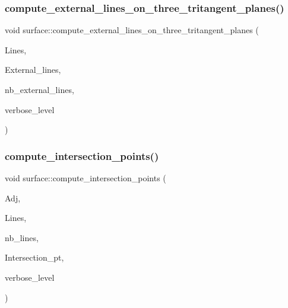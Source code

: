 \mbox{\label{classsurface_ac7678771ed61c488809ea26825484bed}} 
\subsubsection{\texorpdfstring{compute\+\_\+external\+\_\+lines\+\_\+on\+\_\+three\+\_\+tritangent\+\_\+planes()}{compute\_external\_lines\_on\_three\_tritangent\_planes()}}
{\footnotesize\ttfamily void surface\+::compute\+\_\+external\+\_\+lines\+\_\+on\+\_\+three\+\_\+tritangent\+\_\+planes (\begin{DoxyParamCaption}\item[{\mbox{\hyperlink{galois_8h_a09fddde158a3a20bd2dcadb609de11dc}{I\+NT}} $\ast$}]{Lines,  }\item[{\mbox{\hyperlink{galois_8h_a09fddde158a3a20bd2dcadb609de11dc}{I\+NT}} $\ast$\&}]{External\+\_\+lines,  }\item[{\mbox{\hyperlink{galois_8h_a09fddde158a3a20bd2dcadb609de11dc}{I\+NT}} \&}]{nb\+\_\+external\+\_\+lines,  }\item[{\mbox{\hyperlink{galois_8h_a09fddde158a3a20bd2dcadb609de11dc}{I\+NT}}}]{verbose\+\_\+level }\end{DoxyParamCaption})}

\mbox{\label{classsurface_a496b99c021b2546b0e610105d56bb549}} 
\subsubsection{\texorpdfstring{compute\+\_\+intersection\+\_\+points()}{compute\_intersection\_points()}}
{\footnotesize\ttfamily void surface\+::compute\+\_\+intersection\+\_\+points (\begin{DoxyParamCaption}\item[{\mbox{\hyperlink{galois_8h_a09fddde158a3a20bd2dcadb609de11dc}{I\+NT}} $\ast$}]{Adj,  }\item[{\mbox{\hyperlink{galois_8h_a09fddde158a3a20bd2dcadb609de11dc}{I\+NT}} $\ast$}]{Lines,  }\item[{\mbox{\hyperlink{galois_8h_a09fddde158a3a20bd2dcadb609de11dc}{I\+NT}}}]{nb\+\_\+lines,  }\item[{\mbox{\hyperlink{galois_8h_a09fddde158a3a20bd2dcadb609de11dc}{I\+NT}} $\ast$\&}]{Intersection\+\_\+pt,  }\item[{\mbox{\hyperlink{galois_8h_a09fddde158a3a20bd2dcadb609de11dc}{I\+NT}}}]{verbose\+\_\+level }\end{DoxyParamCaption})}

